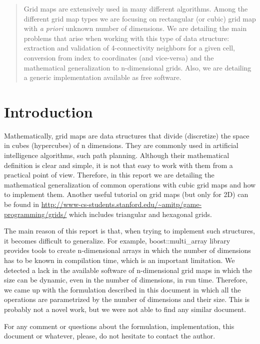 \documentclass[12pt]{article}
\begin{document}
\maketitle

\begin{abstract}
\noindent Grid maps are extensively used in many different algorithms. Among the different grid map types we are focusing on rectangular (or cubic)
grid map with \emph{a priori} unknown number of dimensions. We are detailing the main problems that arise when working with this
type of data structure: extraction and validation of 4-connectivity neighbors for a given cell, conversion from index to coordinates (and vice-versa)
and the mathematical generalization to n-dimensional grids. Also, we are detailing a generic implementation available as free software.
\end{abstract}

\section{Introduction}
Mathematically, grid maps are data structures that divide (discretize) the space in cubes (hypercubes) of n dimensions. They are commonly
used in artificial intelligence algorithms, such path planning. Although their mathematical definition is clear and simple, it is not
that easy to work with them from a practical point of view. Therefore, in this report we are detailing the mathematical generalization
of common operations with cubic grid maps and how to implement them. Another useful tutorial on grid maps (but only for 2D) can be found 
in \url{http://www-cs-students.stanford.edu/~amitp/game-programming/grids/} which includes triangular and hexagonal grids.


The main reason of this report is that, when trying to implement such structures, it becomes difficult to generalize. For example,
boost::multi\_array library provides tools to create n-dimensional arrays in which the number of dimensions has to be known in
compilation time, which is an important limitation. We detected a lack in the available software of n-dimensional grid maps in which
the size can be dynamic, even in the number of dimensions, in run time. Therefore, we came up with the formulation described in this document
in which all the operations are parametrized by the number of dimensions and their size. This is probably not a novel work, but we were not
able to find any similar document.

For any comment or questions about the formulation, implementation, this document or whatever, please, do not hesitate to contact the author.
\end{document}
